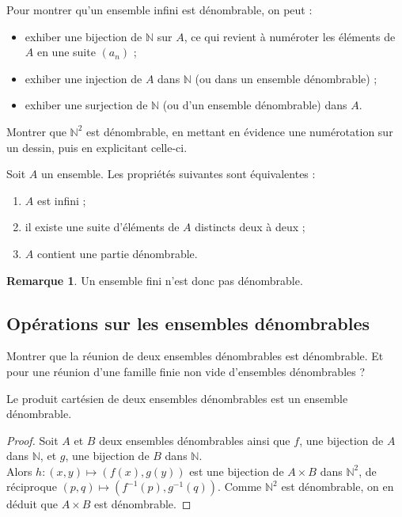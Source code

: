 \documentclass[french]{article}
\newcommand{\N}{\mathbb{N}}
\newcommand{\inv}{^{-1}}
\theoremstyle{plain}
\theoremstyle{definition}
\newtheorem*{rmq}{Remarque}
\theoremstyle{remark}
\begin{document}
\begin{met}
	Pour montrer qu'un ensemble infini est dénombrable, on peut :
	\begin{itemize}
		\item exhiber une bijection de $\N$ sur $A$, ce qui revient à numéroter les éléments de $A$ en une suite $(a_n)$ ;
		\item exhiber une injection de $A$ dans $\N$ (ou dans un ensemble dénombrable) ;
		\item exhiber une surjection de $\N$ (ou d'un ensemble dénombrable) dans $A$.
	\end{itemize}
\end{met}

\begin{exo}
	Montrer que $\N^2$ est dénombrable, en mettant en évidence une numérotation sur un dessin, puis en explicitant celle-ci.
\end{exo}

\begin{prop}%
	Soit $A$ un ensemble. Les propriétés suivantes sont équivalentes :
	\begin{enumerate}[label=(\roman*)]
		\item $A$ est infini ;
		\item il existe une suite d'éléments de $A$ distincts deux à deux ;
		\item $A$ contient une partie dénombrable.
	\end{enumerate}
\end{prop}

\begin{rmq}
	Un ensemble fini n'est donc pas dénombrable.
\end{rmq}

\subsection{Opérations sur les ensembles dénombrables}

\begin{exo}
	Montrer que la réunion de deux ensembles dénombrables est dénombrable. Et pour une réunion d'une famille finie non vide d'ensembles dénombrables ?
\end{exo}

\begin{prop}%
	Le produit cartésien de deux ensembles dénombrables est un ensemble dénombrable.
\end{prop}
\begin{proof}
	Soit $A$ et $B$ deux ensembles dénombrables ainsi que $f$, une bijection de $A$ dans $\N$, et $g$, une bijection de $B$ dans $\N$. \\
	Alors $h:(x,y)\mapsto(f(x),g(y))$ est une bijection de $A\times B$ dans $\N^2$, de réciproque $(p,q)\mapsto(f\inv(p),g\inv(q))$. Comme $\N^2$ est dénombrable, on en déduit que $A\times B$ est dénombrable.
\end{proof}
\end{document}
